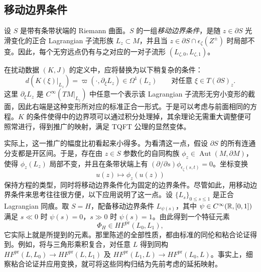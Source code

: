 \subsection{移动边界条件}\label{sec:8k}
\begin{definition*}
设 $S$ 是带有条带状端的 Riemann 曲面。$S$ 的一组\emph{移动边界条件}，是随 $z\in\partial S$ 光滑变化的正合 Lagrangian 子流形族 $L_z\subset M$，并且当 $z\in\partial S\cap\epsilon_\zeta(Z^\pm)$ 时局部不变。因此，每个无穷远点仍有与之对应的一对子流形 $(L_{\zeta,0},L_{\zeta,1})$。
\end{definition*}
在扰动数据
$(K,J)$ 的定义中，应将替换为以下稍复杂的条件：
\begin{equation}\label{eq:8.21}
d(K(\xi)|_{L_z})=\varpi(\cdot,\partial_\xi L_z)\in\Omega^1(L_z)
\qquad\text{对任意 }\xi\in T(\partial S)_z.
\end{equation}
这里 $\partial_\xi L_z$ 是 $C^\infty(TM|_{L_z})$ 中任意一个表示该 Lagrangian 子流形无穷小变形的截面，因此右端是这种变形所对应的标准正合一形式。于是可以考虑与前面相同的方程。$K$ 的条件使得中的边界项可以通过积分处理掉，其余理论无需重大调整便可照常进行，得到推广的映射，满足 TQFT 公理的显然变体。

实际上，这一推广的幅度比初看起来小得多。为看清这一点，假设 $\partial S$ 的所有连通分支都是开区间。于是，存在由 $z\in S$ 参数化的自同构族 $\phi_z\in\operatorname{Aut}(M,\partial M)$，使得 $\phi_z(L_z)$ 局部不变，并且在条带状端上有 $(\partial/\partial s)\phi_{\epsilon_\zeta(s,t)}=0$。坐标变换
\begin{equation}\label{eq:8.22}
u(z)\longmapsto\phi_z(u(z))
\end{equation}
保持方程的类型，同时将移动边界条件化为固定的边界条件。尽管如此，用移动边界条件来思考往往很方便，以下应用说明了这一点。设 $\{L_s\}_{0\leq s\leq1}$ 是正合 Lagrangian 同痕。取 $S=H$，配备移动边界条件 $L_{\psi(s)}$，其中 $\psi\in C^\infty(\mathbb R,[0,1])$ 满足 $s\ll0$ 时 $\psi(s)=0$，$s\gg0$ 时 $\psi(s)=1$。由此得到一个特征元素
\begin{equation}\label{eq:8.23}
\Phi_H\in HF^{\mathrm{pr}}(L_0,L_1),
\end{equation}
它实际上就是所提到的元素。那里陈述的全部性质，都由标准的同伦和粘合论证得到。例如，将与三角形乘积复合，对任意 $L$ 得到同构 $HF^{\mathrm{pr}}(L,L_0)\to HF^{\mathrm{pr}}(L,L_1)$ 及 $HF^{\mathrm{pr}}(L_1,L)\to HF^{\mathrm{pr}}(L_0,L)$。事实上，细察粘合论证并应用变换，就可将这些同构归结为先前考虑的延拓映射。

